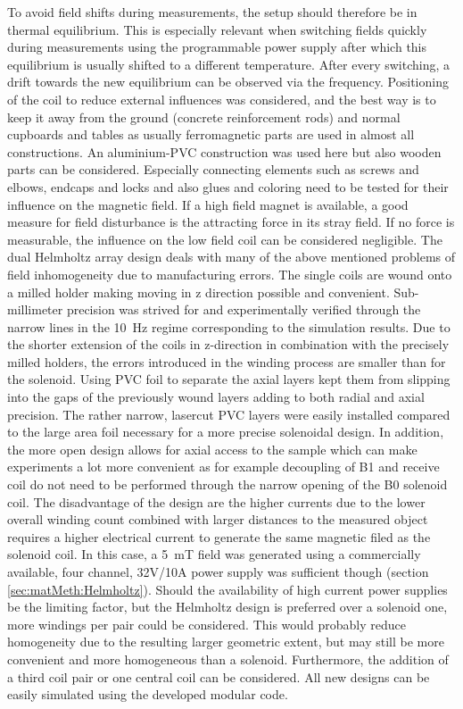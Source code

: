             To avoid field shifts during measurements, the setup should therefore be in thermal equilibrium. This is especially relevant when switching fields quickly during measurements using the programmable power supply after which this equilibrium is usually shifted to a different temperature. After every switching, a drift towards the new equilibrium can be observed via the frequency.
            Positioning of the coil to reduce external influences was considered, and the best way is to keep it away from the ground (concrete reinforcement rods) and normal cupboards and tables as usually ferromagnetic parts are used in almost all constructions. An aluminium-PVC construction was used here but also wooden parts can be considered. Especially connecting elements such as screws and elbows, endcaps and locks and also glues and coloring need to be tested for their influence on the magnetic field. If a high field magnet is available, a good measure for field disturbance is the attracting force in its stray field. If no force is measurable, the influence on the low field coil can be considered negligible.
            The dual Helmholtz array design deals with many of the above mentioned problems of field inhomogeneity due to manufacturing errors. The single coils are wound onto a milled holder making moving in z direction possible and convenient. Sub-millimeter precision was strived for and experimentally verified through the narrow lines in the \SI{10}{\hertz} regime corresponding to the simulation results. Due to the shorter extension of the coils in z-direction in combination with the precisely milled holders, the errors introduced in the winding process are smaller than for the solenoid. Using PVC foil to separate the axial layers kept them from slipping into the gaps of the previously wound layers adding to both radial and axial precision. The rather narrow, lasercut PVC layers were easily installed compared to the large area foil necessary for a more precise solenoidal design.
            In addition, the more open design allows for axial access to the sample which can make experiments a lot more convenient as for example decoupling of B1 and receive coil do not need to be performed through the narrow opening of the B0 solenoid coil. The disadvantage of the design are the higher currents due to the lower overall winding count combined with larger distances to the measured object requires a higher electrical current to generate the same magnetic filed as the solenoid coil. In this case, a \SI{5}{\milli\tesla} field was generated using a commercially available, four channel, 32V/10A power supply was sufficient though (section \ref{sec:matMeth:Helmholtz}). Should the availability of high current power supplies be the limiting factor, but the Helmholtz design is preferred over a solenoid one, more windings per pair could be considered. This would probably reduce homogeneity due to the resulting larger geometric extent, but may still be more convenient and more homogeneous than a solenoid. Furthermore, the addition of a third coil pair or one central coil can be considered. All new designs can be easily simulated using the developed modular code.
